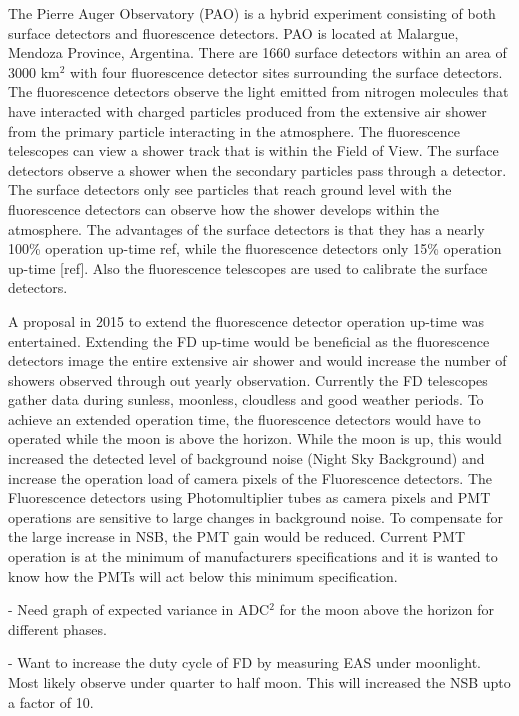 The Pierre Auger Observatory (PAO) is a hybrid experiment consisting of both surface detectors and fluorescence detectors. PAO is located at Malargue, Mendoza Province, Argentina. There are 1660 surface detectors within an area of 3000 km$^2$ with four fluorescence detector sites surrounding the surface detectors. The fluorescence detectors observe the light emitted from nitrogen molecules that have interacted with charged particles produced from the extensive air shower from the primary particle interacting in the atmosphere. The fluorescence telescopes can view a shower track that is within the Field of View. The surface detectors observe a shower when the secondary particles pass through a detector. The surface detectors only see particles that reach ground level with the fluorescence detectors can observe how the shower develops within the atmosphere. The advantages of the surface detectors is that they has a nearly 100\% operation up-time {ref}, while the fluorescence detectors only 15\% operation up-time [ref]. Also the fluorescence telescopes are used to calibrate the surface detectors.

A proposal in 2015 to extend the fluorescence detector operation up-time was entertained. Extending the FD up-time would be beneficial as the fluorescence detectors image the entire extensive air shower and would increase the number of showers observed through out yearly observation. Currently the FD telescopes gather data during sunless, moonless, cloudless and good weather periods. To achieve an extended operation time, the fluorescence detectors would have to operated while the moon is above the horizon. While the moon is up, this would increased the detected level of background noise (Night Sky Background) and increase the operation load of camera pixels of the Fluorescence detectors. The Fluorescence detectors using Photomultiplier tubes as camera pixels and PMT operations are sensitive to large changes in background noise. To compensate for the large increase in NSB, the PMT gain would be reduced. Current PMT operation is at the minimum of manufacturers specifications and it is wanted to know how the PMTs will act below this minimum specification.


- Need graph of expected variance in ADC$^2$ for the moon above the horizon for different phases.

- Want to increase the duty cycle of FD by measuring EAS under moonlight. Most likely observe under quarter to half moon. This will increased the NSB upto a factor of 10.

